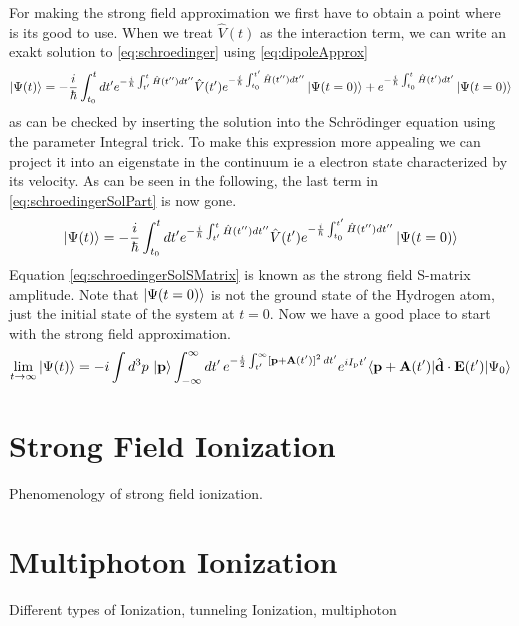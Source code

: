 For making the strong field approximation we first have to obtain a point where is its good to use. 
When we treat $\hat{V}(t)$ as the interaction term, we can write an exakt solution to \eqref{eq:schroedinger} using \eqref{eq:dipoleApprox}
\begin{equation}
    \ket{\Psi(t)} = -\frac{i}{\hbar} \int_{t_0}^{t} dt' e^{-\frac{i}{\hbar} \int_{t'}^{t} \hat{H}(t'') dt''} \hat{V}(t') e^{-\frac{i}{\hbar} \int_{t_0}^{t'} \hat{H}(t'') dt''} \ket{\Psi(t=0)} + e^{-\frac{i}{\hbar} \int_{t_0}^{t} \hat{H}(t') dt'} \ket{\Psi(t=0)} \label{eq:schroedingerSolPart}
\end{equation}
as can be checked by inserting the solution into the Schrödinger equation using the parameter Integral trick. 
To make this expression more appealing we can project it into an eigenstate in the continuum ie a electron state characterized by its velocity.
As can be seen in the following, the last term in \eqref{eq:schroedingerSolPart} is now gone.
\begin{equation}
    \ket{\Psi(t)} = -\frac{i}{\hbar} \int_{t_0}^{t} dt' e^{-\frac{i}{\hbar} \int_{t'}^{t} \hat{H}(t'') dt''} \hat{V}(t') e^{-\frac{i}{\hbar} \int_{t_0}^{t'} \hat{H}(t'') dt''} \ket{\Psi(t=0)} \label{eq:schroedingerSolSMatrix}
\end{equation}
Equation \eqref{eq:schroedingerSolSMatrix} is known as the strong field S-matrix amplitude. Note that $\ket{\Psi(t=0)}$ is not the ground state of the Hydrogen atom, just the initial state of the system at $t=0$. 
Now we have a good place to start with the strong field approximation.
\begin{equation}
    \lim_{t \to \infty} \ket{\Psi(t)}  = -i \int d^3 p\, \ket{\mathbf{p}} \int_{-\infty}^{\infty} dt'\, e^{-\frac{i}{2}\int_{t'}^{\infty} [\mathbf{p}+\mathbf{A}(t')]^2 \, dt'} e^{i I_\mathrm{p} t'} \langle \mathbf{p} + \mathbf{A}(t') | \hat{\mathbf{d}} \cdot \mathbf{E}(t') | \Psi_0 \rangle
\end{equation}



\newpage
\section{Strong Field Ionization}

Phenomenology of strong field ionization.










\newpage
\section{Multiphoton Ionization}

Different types of Ionization, tunneling Ionization, multiphoton